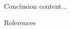\documentclass{beamer}
\begin{document}

	\begin{frame}{Conclusion}
	content...
	\end{frame}

	\begin{frame}{References}
	\tiny
	
	
	\end{frame}
\end{document}
